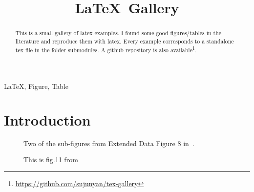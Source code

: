 \documentclass[conference]{IEEEtran}
\title{\LaTeX\, Gallery}
\author{
    \IEEEauthorblockN{Junyan Su}
    \IEEEauthorblockA{junyan.su@my.cityu.edu.hk}
}
\begin{document}
\maketitle

\begin{abstract}
    This is a small gallery of latex examples. I found some good figures/tables in the literature and reproduce them with latex. Every example corresponds to a standalone tex file in the folder submodules. A github repository is also available\footnote{\url{https://github.com/sujunyan/tex-gallery}}.
\end{abstract}


\begin{IEEEkeywords}
    \LaTeX , Figure, Table
\end{IEEEkeywords}

\section{Introduction}
\lipsum[1]
\begin{figure}[tb]
      \centering
        \subfigure[A subcaption]{
            
        }
        \centering
    \caption{Two of the sub-figures from Extended Data Figure 8 in~\cite{2}.}
\end{figure}

\lipsum[1]
\begin{figure}[htb]
    \begin{center}
        
    \end{center} 
    \caption{This is fig.11 from~\cite{1}}
\end{figure}
\end{document}
